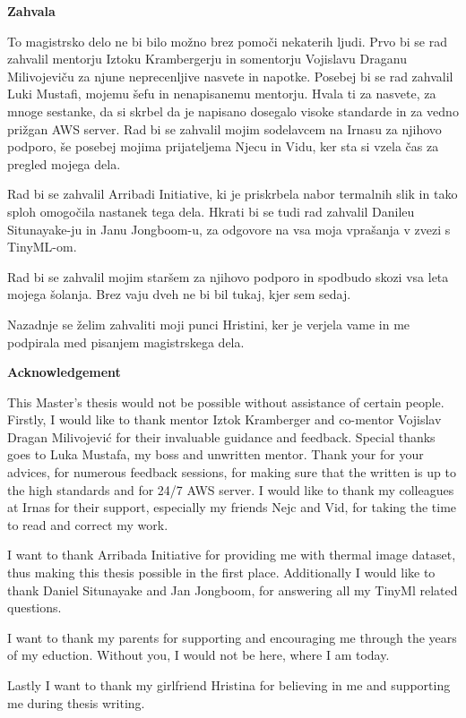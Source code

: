 \begin{poglavje}
\noindent\bfseries Zahvala
\end{poglavje}

To magistrsko delo ne bi bilo možno brez pomoči nekaterih ljudi.
Prvo bi se rad zahvalil mentorju Iztoku Krambergerju in somentorju Vojislavu Draganu Milivojeviču za njune neprecenljive nasvete in napotke.
Posebej bi se rad zahvalil Luki Mustafi, mojemu šefu in nenapisanemu mentorju.
Hvala ti za nasvete, za mnoge sestanke, da si skrbel da je napisano dosegalo visoke standarde in za vedno prižgan AWS server.
Rad bi se zahvalil mojim sodelavcem na Irnasu za njihovo podporo, še posebej mojima prijateljema Njecu in Vidu, ker sta si vzela čas za pregled mojega dela.

Rad bi se zahvalil Arribadi Initiative, ki je priskrbela nabor termalnih slik in tako sploh omogočila nastanek tega dela.
Hkrati bi se tudi rad zahvalil Danileu Situnayake-ju in Janu Jongboom-u, za odgovore na vsa moja vprašanja v zvezi s TinyML-om.

Rad bi se zahvalil mojim staršem za njihovo podporo in spodbudo skozi vsa leta mojega šolanja.
Brez vaju dveh ne bi bil tukaj, kjer sem sedaj.

Nazadnje se želim zahvaliti moji punci Hristini, ker je verjela vame in me podpirala med pisanjem magistrskega dela.
\clearpage

\begin{poglavje}
\noindent\bfseries Acknowledgement
\end{poglavje}

This Master's thesis would not be possible without assistance of certain people.
Firstly, I would like to thank mentor Iztok Kramberger and co-mentor Vojislav Dragan Milivojević for their invaluable guidance and feedback.
Special thanks goes to Luka Mustafa, my boss and unwritten mentor.
Thank your for your advices, for numerous feedback sessions, for making sure that the written is up to the high standards and for 24/7 AWS server.
I would like to thank my colleagues at Irnas for their support, especially my friends Nejc and Vid, for taking the time to read and correct my work.

I want to thank Arribada Initiative for providing me with thermal image dataset, thus making this thesis possible in the first place.
Additionally I would like to thank Daniel Situnayake and Jan Jongboom, for answering all my TinyMl related questions.

I want to thank my parents for supporting and encouraging me through the years of my eduction. 
Without you, I would not be here, where I am today.

Lastly I want to thank my girlfriend Hristina for believing in me and supporting me during thesis writing.
\newpage

